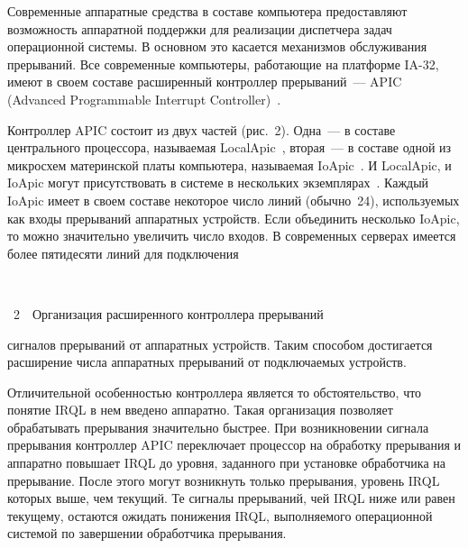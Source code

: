 \begin{multicols}{2}
   Современные аппаратные средства в составе компьютера предоставляют возможность
аппаратной поддержки для реализации диспетчера задач операционной системы. В основном это
касается механизмов обслуживания прерываний. Все современные компьютеры, работающие на
платформе IA-32, имеют в своем составе расширенный контроллер прерываний~--- APIC
(Advanced Programmable Interrupt Controller)~\cite{8eg}.

  
   

   Контроллер APIC состоит из двух частей (рис.~2). Одна~--- в составе центрального
процессора, называемая LocalApic~\cite{6eg, 7eg}, вторая~--- в составе одной из микросхем
материнской платы компьютера, называемая IoApic~\cite{8eg, 9eg}. И LocalApic, и IoApic могут
присутствовать в системе в нескольких экземплярах~\cite{10eg}. Каждый IoApic имеет в своем
составе некоторое число линий (обычно~24), используемых как входы прерываний аппаратных
устройств. Если объединить несколько IoApic, то можно значительно увеличить число входов. В
современных серверах имеется более пятидесяти линий для подключения\linebreak

\begin{center}
\mbox{%
\epsfxsize=77.838mm
}
\end{center}
\vspace*{1pt}
{{\figurename~2}\ \ \small{Организация расширенного контроллера прерываний}}
\addtocounter{figure}{1}  


\noindent
сигналов прерываний от
аппаратных устройств. Таким способом достигается расширение числа аппаратных прерываний от
подключаемых устройств.


   Отличительной особенностью контроллера является то обстоятельство, что понятие IRQL в
нем введено аппаратно. Такая организация позволяет обрабатывать прерывания значительно
быст\-рее. При возникновении сигнала прерывания контроллер APIC переключает процессор на
обработку прерывания и аппаратно повышает IRQL до уровня, заданного при установке
обработчика на прерывание. После этого могут возникнуть только прерывания, уровень IRQL
которых выше, чем текущий. Те сигналы прерываний, чей IRQL ниже или равен текущему,
остаются ожидать понижения IRQL, выполняемого операционной системой по завершении
обработчика прерывания.


\end{multicols}
